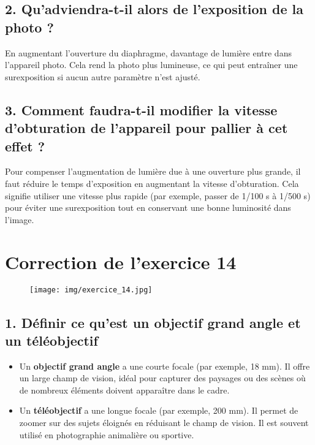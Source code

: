 \documentclass[answers]{exam}
\begin{document}
\subsection*{2. Qu'adviendra-t-il alors de l'exposition de la photo ?}

En augmentant l'ouverture du diaphragme, davantage de lumière entre dans l'appareil photo. Cela rend la photo plus lumineuse, ce qui peut entraîner une surexposition si aucun autre paramètre n'est ajusté.

\subsection*{3. Comment faudra-t-il modifier la vitesse d'obturation de l'appareil pour pallier à cet effet ?}

Pour compenser l'augmentation de lumière due à une ouverture plus grande, il faut réduire le temps d'exposition en augmentant la vitesse d'obturation. Cela signifie utiliser une vitesse plus rapide (par exemple, passer de 1/100 s à 1/500 s) pour éviter une surexposition tout en conservant une bonne luminosité dans l'image.


\section*{Correction de l'exercice 14}


\begin{figure}[H]
  \centering
  \texttt{[image: img/exercice\_14.jpg]}
\end{figure}

\subsection*{1. Définir ce qu'est un objectif grand angle et un téléobjectif}

\begin{itemize}
    \item Un \textbf{objectif grand angle} a une courte focale (par exemple, 18 mm). Il offre un large champ de vision, idéal pour capturer des paysages ou des scènes où de nombreux éléments doivent apparaître dans le cadre.
    \item Un \textbf{téléobjectif} a une longue focale (par exemple, 200 mm). Il permet de zoomer sur des sujets éloignés en réduisant le champ de vision. Il est souvent utilisé en photographie animalière ou sportive.
\end{itemize}
\end{document}
